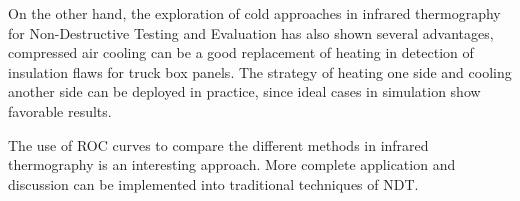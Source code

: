 On the other hand, the exploration of cold approaches in infrared thermography for Non-Destructive Testing and Evaluation has also shown several advantages, compressed air cooling can be a good replacement of heating in detection of insulation flaws for truck box panels. The strategy of heating one side and cooling another side can be deployed in practice, since ideal cases in simulation show favorable results.

The use of ROC curves to compare the different methods in infrared thermography is an interesting approach. More complete application and discussion can be implemented into traditional techniques of NDT.



